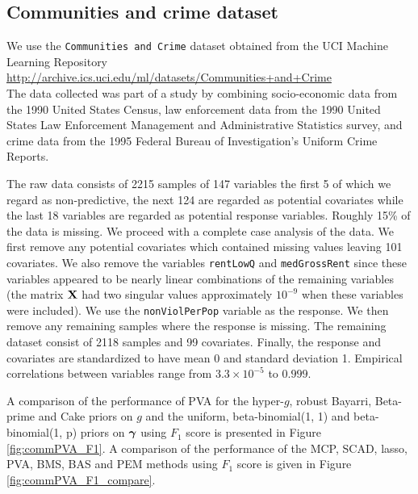 \subsection{Communities and crime dataset}
\label{sec:crime}

We use the {\tt Communities and Crime} dataset obtained from the
UCI Machine Learning Repository   \\

\url{http://archive.ics.uci.edu/ml/datasets/Communities+and+Crime}  \\

\noindent 
The data collected was part
of a study by \cite{Redmond2002} combining socio-economic data
from the 1990 United States Census, law enforcement data from the 1990 United States Law Enforcement Management and Administrative
Statistics
survey, and crime data from the 1995 Federal Bureau of Investigation's Uniform
Crime Reports.

The raw data consists of 2215 samples of 147 variables the first 5 of which
we regard as non-predictive, the next 124 are regarded as potential
covariates while the last 18 variables are regarded as potential response
variables. Roughly 15\% of the data is missing. We proceed with a complete
case analysis of the data.
We first remove any potential covariates which contained missing values leaving
101 covariates. We also remove the variables {\tt rentLowQ} and
{\tt medGrossRent} since these variables appeared to be nearly linear
combinations of the remaining variables (the matrix ${\bf X}$ had two singular
values approximately $10^{-9}$ when these variables were included).  We use the
{\tt nonViolPerPop} variable as the response. We then remove any remaining
samples where the response is missing. The remaining dataset consist of 2118
samples and 99 covariates. Finally, the response and covariates are standardized to have mean 0 and standard deviation 1. Empirical correlations between variables range from $3.3\times10^{-5}$ to $0.999$.

A comparison of the performance of PVA for the hyper-$g$, robust Bayarri, Beta-prime and Cake priors on $g$
and the uniform, beta-binomial(1, 1) and beta-binomial(1, p) priors on ${\boldsymbol \gamma}$ using $F_1$ score is
presented in Figure \ref{fig:commPVA_F1}. A comparison of the performance of the MCP, SCAD, lasso, PVA, BMS,
BAS and PEM  methods using $F_1$ score is given in Figure \ref{fig:commPVA_F1_compare}.

